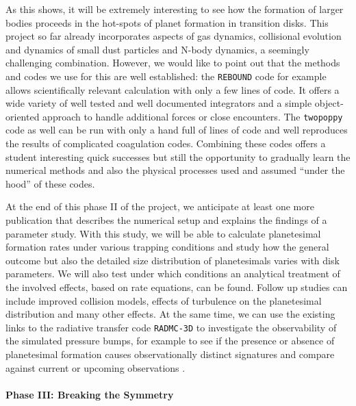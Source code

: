 \documentclass[10pt,fleqn,twoside]{article}
\newcommand{\twopoppy}{\texttt{twopoppy}\xspace}
\newcommand{\rebound}{\texttt{REBOUND}\xspace}
\newcommand{\radmc}{\texttt{RADMC-3D}\xspace}
\begin{document}
As this shows, it will be extremely interesting to see how the
formation of larger bodies proceeds in the hot-spots of planet
formation in transition disks. This project so far already
incorporates aspects of gas dynamics, collisional evolution and
dynamics of small dust particles and N-body dynamics, a seemingly
challenging combination. However, we would like to point out that the
methods and codes we use for this are well established: the \rebound
code for example allows scientifically relevant calculation with only
a few lines of code. It offers a wide variety of well tested and well
documented integrators and a simple object-oriented approach to handle
additional forces or close encounters. The \twopoppy code as well can
be run with only a hand full of lines of code and well reproduces the
results of complicated coagulation codes. Combining these codes offers
a student interesting quick successes but still the opportunity to
gradually learn the numerical methods and also the physical processes
used and assumed ``under the hood'' of these codes.

At the end of this phase II of the project, we anticipate at least one
more publication that describes the numerical setup and explains the
findings of a parameter study. With this study, we will be able to
calculate planetesimal formation rates under various trapping
conditions and study how the general outcome but also the detailed
size distribution of planetesimals varies with disk parameters. We
will also test under which conditions an analytical treatment of the
involved effects, based on rate equations, can be found. Follow up
studies can include improved collision models, effects of turbulence
on the planetesimal distribution and many other effects. At the same
time, we can use the existing links to the radiative transfer code
\radmc to investigate the observability of the simulated pressure
bumps, for example to see if the presence or absence of planetesimal
formation causes observationally distinct signatures and compare
against current or upcoming observations .

\paragraph{Phase III: Breaking the Symmetry}
\label{sec:phaseIII}
\end{document}
